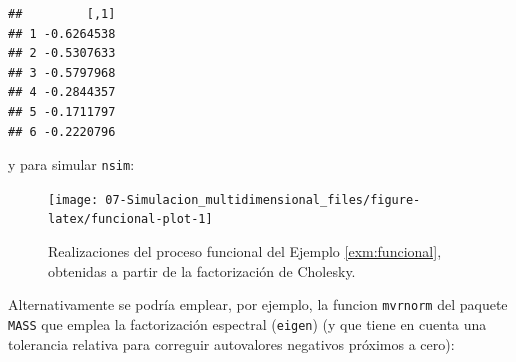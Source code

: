 \documentclass[
]{book}
\newenvironment{Shaded}{\begin{snugshade}}{\end{snugshade}}
\newcommand{\DataTypeTok}[1]{\textcolor[rgb]{0.13,0.29,0.53}{#1}}
\newcommand{\DecValTok}[1]{\textcolor[rgb]{0.00,0.00,0.81}{#1}}
\newcommand{\FloatTok}[1]{\textcolor[rgb]{0.00,0.00,0.81}{#1}}
\newcommand{\KeywordTok}[1]{\textcolor[rgb]{0.13,0.29,0.53}{\textbf{#1}}}
\newcommand{\NormalTok}[1]{#1}
\newcommand{\OperatorTok}[1]{\textcolor[rgb]{0.81,0.36,0.00}{\textbf{#1}}}
\newcommand{\StringTok}[1]{\textcolor[rgb]{0.31,0.60,0.02}{#1}}
\theoremstyle{break}
\theoremstyle{definition}
\theoremstyle{definition}
\theoremstyle{definition}
\theoremstyle{remark}
\begin{document}
\begin{Shaded}
\end{Shaded}

\begin{verbatim}
##         [,1]
## 1 -0.6264538
## 2 -0.5307633
## 3 -0.5797968
## 4 -0.2844357
## 5 -0.1711797
## 6 -0.2220796
\end{verbatim}

y para simular \texttt{nsim}:



\begin{Shaded}
\end{Shaded}

\begin{figure}[!htb]

{\centering \texttt{[image: 07-Simulacion\_multidimensional\_files/figure-latex/funcional-plot-1]} 

}

\caption{Realizaciones del proceso funcional del Ejemplo \ref{exm:funcional}, obtenidas a partir de la factorización de Cholesky.}\label{fig:funcional-plot}
\end{figure}

Alternativamente se podría emplear, por ejemplo, la funcion \texttt{mvrnorm}
del paquete \texttt{MASS} que emplea la factorización espectral (\texttt{eigen}) (y que tiene en cuenta una tolerancia relativa para correguir autovalores negativos próximos a cero):
\end{document}
